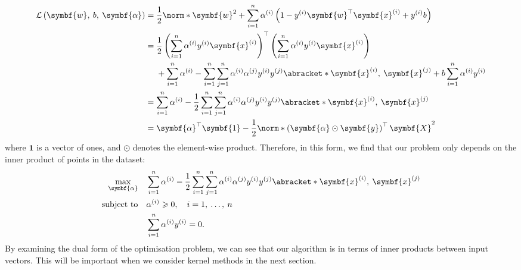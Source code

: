 \documentclass{article}
\begin{document}
\begin{align*}
    \mathcal{L}\left( \symbf{w},\: b,\: \symbf{\alpha} \right) & = \frac{1}{2}\norm*{\symbf{w}}^2 + \sum_{i = 1}^n \alpha^{\left( i \right)} \left( 1 - y^{\left( i \right)} \symbf{w}^\top \symbf{x}^{\left( i \right)} + y^{\left( i \right)} b \right)                                                                      \\
                                                               & =
    \begin{aligned}[t]
         & \frac{1}{2} \left( \sum_{i = 1}^n \alpha^{\left( i \right)} y^{\left( i \right)} \symbf{x}^{\left( i \right)} \right)^\top \left( \sum_{i = 1}^n \alpha^{\left( i \right)} y^{\left( i \right)} \symbf{x}^{\left( i \right)} \right)                                                                                \\
         & + \sum_{i = 1}^n \alpha^{\left( i \right)} - \sum_{i = 1}^n \sum_{j = 1}^n \alpha^{\left( i \right)} \alpha^{\left( j \right)} y^{\left( i \right)} y^{\left( j \right)} \abracket*{\symbf{x}^{\left( i \right)},\: \symbf{x}^{\left( j \right)}} + b \sum_{i = 1}^n \alpha^{\left( i \right)} y^{\left( i \right)}
    \end{aligned}
    \\
                                                               & = \sum_{i = 1}^n \alpha^{\left( i \right)} - \frac{1}{2} \sum_{i = 1}^n \sum_{j = 1}^n \alpha^{\left( i \right)} \alpha^{\left( j \right)} y^{\left( i \right)} y^{\left( j \right)} \abracket*{\symbf{x}^{\left( i \right)},\: \symbf{x}^{\left( j \right)}} \\
                                                               & = \symbf{\alpha}^\top \symbf{1} - \frac{1}{2} \norm*{\left( \symbf{\alpha} \odot \symbf{y} \right)^\top \symbf{X}}^2
\end{align*}
where \(\symbf{1}\) is a vector of ones, and \(\odot\) denotes the
element-wise product.
Therefore, in this form, we find that our problem only depends on the
inner product of points in the dataset:
\begin{align*}
    \max_{\symbf{\alpha}} \quad & \sum_{i = 1}^n \alpha^{\left( i \right)} - \frac{1}{2} \sum_{i = 1}^n \sum_{j = 1}^n \alpha^{\left( i \right)} \alpha^{\left( j \right)} y^{\left( i \right)} y^{\left( j \right)} \abracket*{\symbf{x}^{\left( i \right)},\: \symbf{x}^{\left( j \right)}} \\
    \text{subject to} \quad     & \alpha^{\left( i \right)} \geqslant 0, \quad i = 1,\: \dots,\: n                                                                                                                                                                                            \\
                                & \sum_{i = 1}^n \alpha^{\left( i \right)} y^{\left( i \right)} = 0.
\end{align*}
By examining the dual form of the optimisation problem, we can see that
our algorithm is in terms of inner products between input vectors. This
will be important when we consider kernel methods in the next section.
\end{document}
